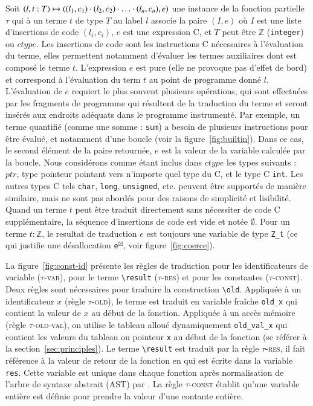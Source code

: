 Soit
$(l, t:T) \mapsto ((l_1, c_1) \cdot (l_2, c_2) \cdot \ldots \cdot (l_n, c_n), e)$
une instance de la fonction partielle $\tau$ qui à un terme \eacsl $t$ de type
$T$ au label $l$ associe la paire $(I, e)$ où $I$ est une liste d'insertions de
code $(l_i, c_i)$, $e$ est une expression C, et $T$ peut être $\mathbb{Z}$
(\lstinline'integer') ou $ctype$.
Les insertions de code sont les instructions C nécessaires à l'évaluation du
terme, elles permettent notamment d'évaluer les termes auxiliaires dont est
composé le terme $t$.
L'expression $e$ est pure (elle ne provoque pas d'effet de bord) et correspond
à l'évaluation du term $t$ au point de programme donné $l$.
L'évaluation de $e$ requiert le plus souvent plusieurs opérations, qui sont
effectuées par les fragments de programme qui résultent de la traduction du
terme et seront insérés aux endroits adéquats dans le programme instrumenté.
Par exemple, un terme quantifié (comme une somme : \lstinline'sum') a besoin de
plusieurs instructions pour être évalué, et notamment d'une boucle (voir la
figure~\ref{fig:builtin}).
Dans ce cas, le second élément de la paire retournée, $e$ est la valeur de la
variable calculée par la boucle.
Nous considérons comme étant inclus dans $ctype$ les types suivants : $ptr$,
type pointeur pointant vers n'importe quel type du C, et le type C
\lstinline'int'.
Les autres types C tels \lstinline'char', \lstinline'long',
\lstinline'unsigned', etc. peuvent être supportés de manière similaire, mais ne
sont pas abordés pour des raisons de simplicité et lisibilité.
Quand un terme $t$ peut être traduit directement sans nécessiter de code C
supplémentaire, la séquence d'insertions de code est vide et notée $\emptyset$.
Pour un terme $t:\mathbb{Z}$, le resultat de traduction $e$ est toujours une
variable de type \lstinline'Z_t' (ce qui justifie une désallocation
\lstinline{e}${}^{\boxtimes}$, voir figure~\ref{fig:coerce}).

La figure~\ref{fig:const-id} présente les règles de traduction pour les
identificateurs de variable (\textsc{$\tau$-var}), pour le terme
\lstinline|\result| (\textsc{$\tau$-res}) et pour les constantes
(\textsc{$\tau$-const}).
Deux règles sont nécessaires pour traduire la construction \eacsl
\lstinline|\old|.
Appliquée à un identificateur $x$ (règle \textsc{$\tau$-old}), le terme est
traduit en variable fraîche \lstinline|old_x| qui contient la valeur de $x$ au
début de la fonction.
Appliquée à un accès mémoire (règle \textsc{$\tau$-old-val}), on utilise le
tableau alloué dynamiquement \lstinline|old_val_x| qui contient les valeurs du
tableau ou pointeur \lstinline'x' au début de la fonction (se référer à la
section~\ref{sec:principles}).
Le terme \lstinline|\result| est traduit par la règle \textsc{$\tau$-res}, il
fait référence à la valeur de retour de la fonction en \eacsl qui est écrite
dans la variable \lstinline|res|.
Cette variable est unique dans chaque fonction après normalisation de l'arbre de
syntaxe abstrait (AST) par \framac.
La règle \textsc{$\tau$-const} établit qu'une variable entière est définie pour
prendre la valeur d'une contante entière.

